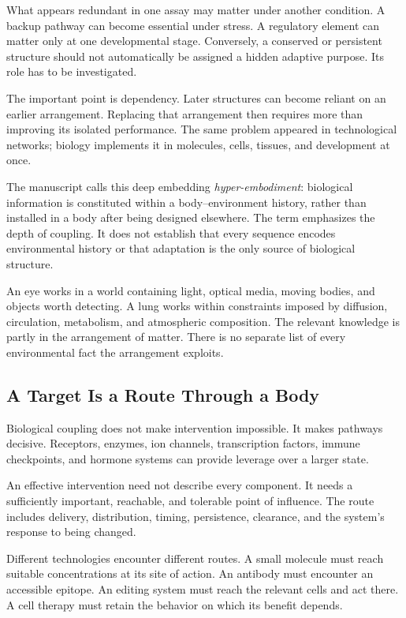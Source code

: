 \documentclass[11pt,openany]{book}
\begin{document}
What appears redundant in one assay may matter under another condition. A backup pathway can become essential under stress. A regulatory element can matter only at one developmental stage. Conversely, a conserved or persistent structure should not automatically be assigned a hidden adaptive purpose. Its role has to be investigated.

The important point is dependency. Later structures can become reliant on an earlier arrangement. Replacing that arrangement then requires more than improving its isolated performance. The same problem appeared in technological networks; biology implements it in molecules, cells, tissues, and development at once.

The manuscript calls this deep embedding \emph{hyper-embodiment}: biological information is constituted within a body--environment history, rather than installed in a body after being designed elsewhere. The term emphasizes the depth of coupling. It does not establish that every sequence encodes environmental history or that adaptation is the only source of biological structure.

An eye works in a world containing light, optical media, moving bodies, and objects worth detecting. A lung works within constraints imposed by diffusion, circulation, metabolism, and atmospheric composition. The relevant knowledge is partly in the arrangement of matter. There is no separate list of every environmental fact the arrangement exploits.

\subsection{A Target Is a Route Through a Body}

Biological coupling does not make intervention impossible. It makes pathways decisive. Receptors, enzymes, ion channels, transcription factors, immune checkpoints, and hormone systems can provide leverage over a larger state.

An effective intervention need not describe every component. It needs a sufficiently important, reachable, and tolerable point of influence. The route includes delivery, distribution, timing, persistence, clearance, and the system's response to being changed.

Different technologies encounter different routes. A small molecule must reach suitable concentrations at its site of action. An antibody must encounter an accessible epitope. An editing system must reach the relevant cells and act there. A cell therapy must retain the behavior on which its benefit depends.
\end{document}
